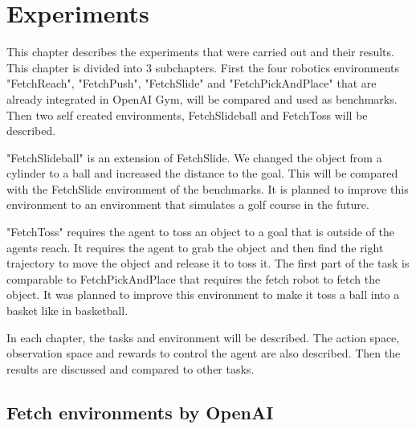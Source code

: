 \chapter{Experiments}

This chapter describes the experiments that were carried out and their results. This chapter is divided into 3 subchapters.
\newline
First the four robotics environments "FetchReach", "FetchPush", "FetchSlide" and "FetchPickAndPlace" that are already integrated in OpenAI Gym, will be compared and used as benchmarks.
Then two self created environments, FetchSlideball and FetchToss will be described.
\vspace{0.5cm}

"FetchSlideball" is an extension of FetchSlide. We changed the object from a cylinder to a ball and increased the distance to the goal. This will be compared with the FetchSlide environment of the benchmarks. It is planned to improve this environment to an environment that simulates a golf course in the future.
\vspace{0.5cm}

"FetchToss" requires the agent to toss an object to a goal that is outside of the agents reach. It requires the agent to grab the object and then find the right trajectory to move the object and release it to toss it. The first part of the task is comparable to FetchPickAndPlace that requires the fetch robot to fetch the object. It was planned to improve this environment to make it toss a ball into a basket like in basketball.
\vspace{0.5cm}

In each chapter, the tasks and environment will be described. The action space, observation space and rewards to control the agent are also described. Then the results are discussed and compared to other tasks.   


\section{Fetch environments by OpenAI}

